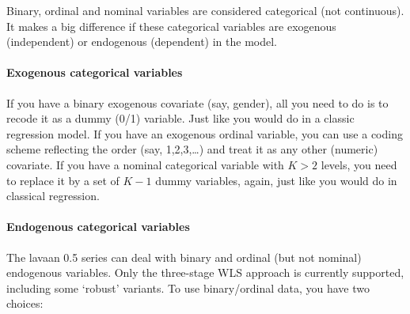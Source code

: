 Binary, ordinal and nominal variables are considered categorical (not
continuous). It makes a big difference if these categorical variables
are exogenous (independent) or endogenous (dependent) in the model.

\paragraph{Exogenous categorical variables}

If you have a binary exogenous covariate (say, gender), all you need to
do is to recode it as a dummy (0/1) variable. Just like you would do in
a classic regression model. If you have an exogenous ordinal variable,
you can use a coding scheme reflecting the order (say, 1,2,3,\ldots{})
and treat it as any other (numeric) covariate. If you have a nominal
categorical variable with $K > 2$ levels, you need to replace it by a
set of $K-1$ dummy variables, again, just like you would do in classical
regression.

\paragraph{Endogenous categorical variables}

The lavaan 0.5 series can deal with binary and ordinal (but not nominal)
endogenous variables. Only the three-stage WLS approach is currently
supported, including some `robust' variants. To use binary/ordinal data,
you have two choices:

